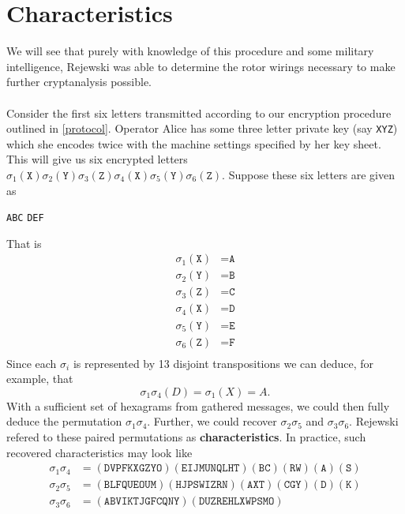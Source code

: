 \section{Characteristics}
We will see that purely with knowledge of this procedure and some
military intelligence, Rejewski was able to determine the rotor
wirings necessary to make further cryptanalysis possible.
\\\\Consider the first six letters transmitted according to our
encryption procedure outlined in \ref{protocol}. Operator Alice has some three letter private
key (say \texttt{XYZ}) which she encodes twice with the machine
settings specified by her key sheet. This will give us six encrypted
letters
$\sigma_1(\texttt{X})\sigma_2(\texttt{Y})\sigma_3(\texttt{Z})\sigma_4(\texttt{X})\sigma_5(\texttt{Y})\sigma_6(\texttt{Z})$.
Suppose these six letters are given as
\begin{center}
	\texttt{ABC} \texttt{DEF}
\end{center}
That is
\begin{align*}
	\sigma_1(\texttt{X}) & = \texttt{A} \\
	\sigma_2(\texttt{Y}) & = \texttt{B} \\
	\sigma_3(\texttt{Z}) & = \texttt{C} \\
	\sigma_4(\texttt{X}) & = \texttt{D} \\
	\sigma_5(\texttt{Y}) & = \texttt{E} \\
	\sigma_6(\texttt{Z}) & = \texttt{F} \\
\end{align*}
Since each $\sigma_i$ is represented by 13 disjoint transpositions we
can deduce, for example, that
\[
	\sigma_1\sigma_4(D) = \sigma_1(X) = A.
\]
With a sufficient set of hexagrams from gathered messages, we could
then fully deduce the permutation $\sigma_1\sigma_4$. Further, we
could recover $\sigma_2\sigma_5$ and $\sigma_3\sigma_6$. Rejewski
refered to these paired permutations as {\bf{characteristics}}. In
practice, such recovered characteristics may look like
\begin{align*}
	\sigma_1\sigma_4 & =
	(\texttt{DVPFKXGZYO})(\texttt{EIJMUNQLHT})(\texttt{BC})(\texttt{RW})(\texttt{A})(\texttt{S})
	\\
	\sigma_2\sigma_5 & =
	(\texttt{BLFQUEOUM})(\texttt{HJPSWIZRN})(\texttt{AXT})(\texttt{CGY})(\texttt{D})(\texttt{K})
	\\
	\sigma_3\sigma_6 & = (\texttt{ABVIKTJGFCQNY})(\texttt{DUZREHLXWPSMO})
\end{align*}
